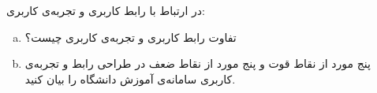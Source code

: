 در ارتباط با رابط کاربری و تجربه‌ی کاربری:
\begin{enumerate}[a)]
	\item 
تفاوت رابط کاربری و تجربه‌ی کاربری چیست؟
	 \item 
پنج مورد از نقاط قوت و پنج مورد از نقاط ضعف در طراحی رابط و تجربه‌ی کاربری سامانه‌ی آموزش دانشگاه را بیان کنید.‌
\end{enumerate}

